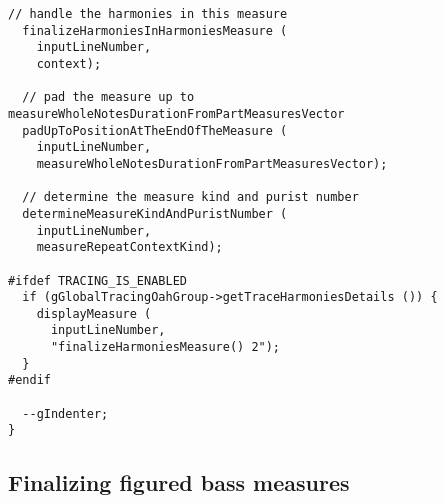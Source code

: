 \begin{lstlisting}[language=CPlusPlus]
  // handle the harmonies in this measure
  finalizeHarmoniesInHarmoniesMeasure (
    inputLineNumber,
    context);

  // pad the measure up to measureWholeNotesDurationFromPartMeasuresVector
  padUpToPositionAtTheEndOfTheMeasure (
    inputLineNumber,
    measureWholeNotesDurationFromPartMeasuresVector);

  // determine the measure kind and purist number
  determineMeasureKindAndPuristNumber (
    inputLineNumber,
    measureRepeatContextKind);

#ifdef TRACING_IS_ENABLED
  if (gGlobalTracingOahGroup->getTraceHarmoniesDetails ()) {
    displayMeasure (
      inputLineNumber,
      "finalizeHarmoniesMeasure() 2");
  }
#endif

  --gIndenter;
}
\end{lstlisting}


\subsection{Finalizing figured bass measures}

